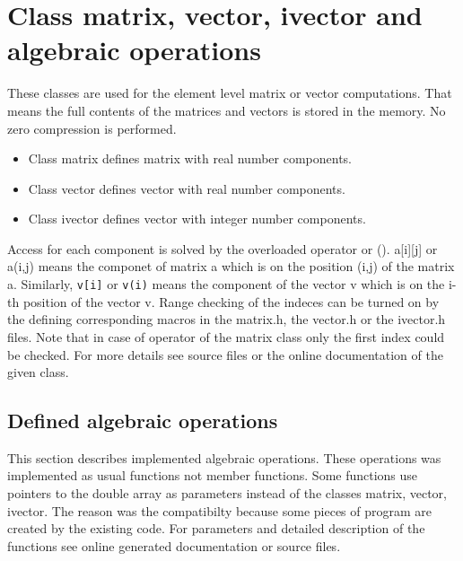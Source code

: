 \chapter {Class {\sf matrix, vector, ivector} and algebraic operations}
These classes are used for the element level matrix or vector computations. That means the full contents
of the matrices and vectors is stored in the memory. No zero compression is performed. 
\begin {itemize}
\item Class {\sf matrix} defines matrix with real number components.
\item Class {\sf vector} defines vector with real number components.
\item Class {\sf ivector} defines vector with integer number components.
\end{itemize}
Access for each component is solved by the overloaded operator {\sf []} or {\sf ()}. {\sf a[i][j]} or {\sf a(i,j)} means 
the componet of matrix {\sf a} which is on the position (i,j) of the matrix {\sf a}. Similarly, {\tt v[i]} or {\tt v(i)} 
means the component of the vector {\sf v} which is on the i-th position of the vector v. Range checking of the
indeces can be turned on by the defining corresponding macros in the {\sf matrix.h}, the {\sf vector.h}
or the {\sf ivector.h} files.
Note that in case of {\sf []} operator of the {\sf matrix} class only the first index could be checked. For more details see
source files or the online documentation of the given class.
\section {Defined algebraic operations}
This section describes implemented algebraic operations. These operations was implemented as
usual functions not member functions. Some functions use pointers to the double array as parameters instead of the classes
{\sf matrix, vector, ivector}. The reason was the compatibilty because some pieces of program are created by the existing code.
For parameters and detailed description of the functions see online generated documentation or source files.

